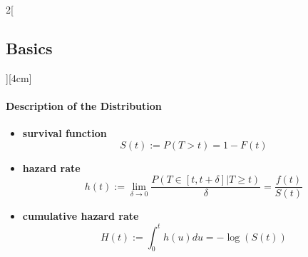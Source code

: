 \documentclass[8pt]{extarticle}
\begin{document}
\begin{multicols}{2}[\subsection{Basics}][4cm]
\paragraph{Description of the Distribution} 

\begin{itemize}
\item \textbf{survival function}  $$S(t) := P(T>t) = 1 - F(t) $$
\item \textbf{hazard rate} $$h(t) := \lim_{\delta \rightarrow 0} \frac{P(T \in [t,t+\delta]|T\geq t)}{\delta} = \frac{f(t)}{S(t)}$$
\item \textbf{cumulative hazard rate} $$H(t) := \int_0^t h(u)du = -\log(S(t))$$
\end{itemize}


\end{multicols}
\end{document}
